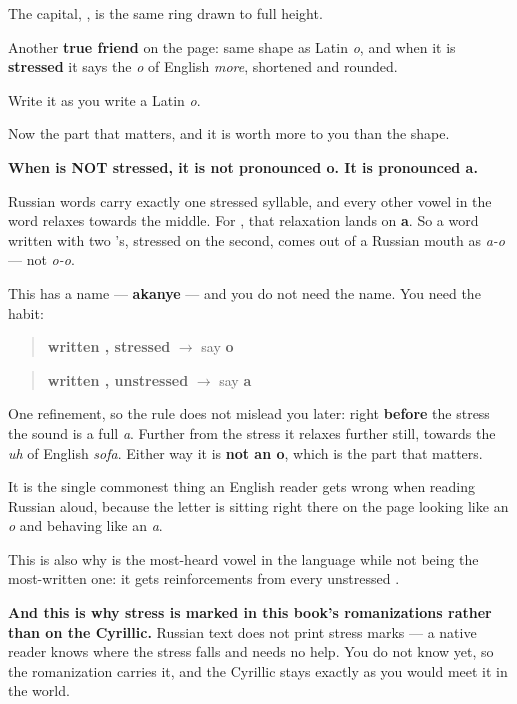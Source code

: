 The capital, \textbf{}, is the same ring drawn to full height.

Another \textbf{true friend} on the page: same shape as Latin \emph{o}, and when it is \textbf{stressed} it says the \emph{o} of English \emph{more}, shortened and rounded.

Write it as you write a Latin \emph{o}.

\begin{culture}
Now the part that matters, and it is worth more to you than the shape.

\textbf{When  is NOT stressed, it is not pronounced o. It is pronounced a.}

Russian words carry exactly one stressed syllable, and every other vowel in the word relaxes towards the middle. For , that relaxation lands on \textbf{a}. So a word written with two 's, stressed on the second, comes out of a Russian mouth as \emph{a-o} — not \emph{o-o}.

This has a name — \textbf{akanye} — and you do not need the name. You need the habit:

\begin{quote}
\textbf{written , stressed} $\to$ say \textbf{o}
\end{quote}

\begin{quote}
\textbf{written , unstressed} $\to$ say \textbf{a}
\end{quote}

One refinement, so the rule does not mislead you later: right \textbf{before} the stress the sound is a full \emph{a}. Further from the stress it relaxes further still, towards the \emph{uh} of English \emph{sofa}. Either way it is \textbf{not an o}, which is the part that matters.

It is the single commonest thing an English reader gets wrong when reading Russian aloud, because the letter is sitting right there on the page looking like an \emph{o} and behaving like an \emph{a}.

This is also why \textbf{} is the most-heard vowel in the language while not being the most-written one: it gets reinforcements from every unstressed .

\textbf{And this is why stress is marked in this book's romanizations rather than on the Cyrillic.} Russian text does not print stress marks — a native reader knows where the stress falls and needs no help. You do not know yet, so the romanization carries it, and the Cyrillic stays exactly as you would meet it in the world.
\end{culture}

